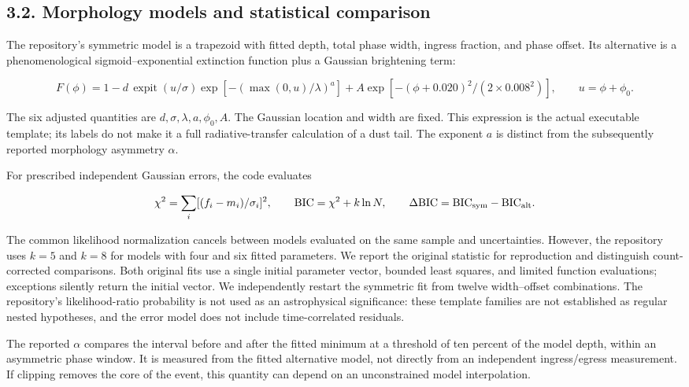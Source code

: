 \documentclass[
  english,
]{article}
\begin{document}
\subsection{3.2. Morphology models and statistical
comparison}\label{morphology-models-and-statistical-comparison}

The repository's symmetric model is a trapezoid with fitted depth, total
phase width, ingress fraction, and phase offset. Its alternative is a
phenomenological sigmoid--exponential extinction function plus a
Gaussian brightening term:

\[
F(\phi)=1-d\,\operatorname{expit}(u/\sigma)\exp[-(\max(0,u)/\lambda)^a]
 +A\exp[-(\phi+0.020)^2/(2\times0.008^2)],\qquad u=\phi+\phi_0.
\]

The six adjusted quantities are \(d,\sigma,\lambda,a,\phi_0,A\). The
Gaussian location and width are fixed. This expression is the actual
executable template; its labels do not make it a full radiative-transfer
calculation of a dust tail. The exponent \(a\) is distinct from the
subsequently reported morphology asymmetry \(\alpha\).

For prescribed independent Gaussian errors, the code evaluates

\[
\chi^2=\sum_i[(f_i-m_i)/\sigma_i]^2,\qquad
\mathrm{BIC}=\chi^2+k\ln N,\qquad
\Delta\mathrm{BIC}=\mathrm{BIC}_{\rm sym}-\mathrm{BIC}_{\rm alt}.
\]

The common likelihood normalization cancels between models evaluated on
the same sample and uncertainties. However, the repository uses \(k=5\)
and \(k=8\) for models with four and six fitted parameters. We report
the original statistic for reproduction and distinguish count-corrected
comparisons. Both original fits use a single initial parameter vector,
bounded least squares, and limited function evaluations; exceptions
silently return the initial vector. We independently restart the
symmetric fit from twelve width--offset combinations. The repository's
likelihood-ratio probability is not used as an astrophysical
significance: these template families are not established as regular
nested hypotheses, and the error model does not include time-correlated
residuals.

The reported \(\alpha\) compares the interval before and after the
fitted minimum at a threshold of ten percent of the model depth, within
an asymmetric phase window. It is measured from the fitted alternative
model, not directly from an independent ingress/egress measurement. If
clipping removes the core of the event, this quantity can depend on an
unconstrained model interpolation.
\end{document}
